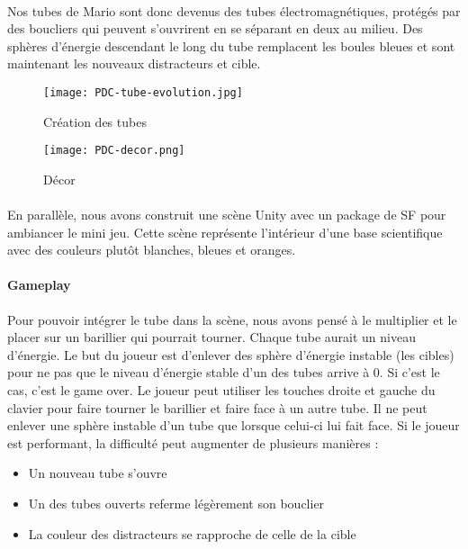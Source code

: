\paragraph{}Nos tubes de Mario sont donc devenus des tubes électromagnétiques, protégés par des boucliers qui peuvent s'ouvrirent en se séparant en deux au milieu. Des sphères
d'énergie descendant le long du tube remplacent les boules bleues et sont maintenant les nouveaux distracteurs et cible.

\begin{figure}[H]
    \begin{center}
    \texttt{[image: PDC-tube-evolution.jpg]}
    \end{center}
    \caption{Création des tubes}
\label{TubeEvolution}
\end{figure}

\begin{wrapfigure}[5]{r}{5cm}
    \vspace{-25pt}
    \texttt{[image: PDC-decor.png]}
    \captionsetup{labelformat=simpleNumber}
    \caption{Décor}
\end{wrapfigure}

\paragraph{}En parallèle, nous avons construit une scène Unity avec un package de \gls{SF} pour ambiancer le mini jeu. Cette scène représente l'intérieur d'une base scientifique avec
des couleurs plutôt blanches, bleues et oranges.

\newpage

\paragraph{Gameplay}Pour pouvoir intégrer le tube dans la scène, nous avons pensé à le multiplier et le placer sur un barillier qui pourrait tourner. Chaque tube aurait un niveau
d'énergie. Le but du joueur est d'enlever des sphère d'énergie instable (les cibles) pour ne pas que le niveau d'énergie stable d'un des tubes arrive à 0. Si c'est le cas, c'est le
game over. Le joueur peut utiliser les touches droite et gauche du clavier pour faire tourner le barillier et faire face à un autre tube. Il ne peut enlever une sphère instable d'un
tube que lorsque celui-ci lui fait face. Si le joueur est performant, la difficulté peut augmenter de plusieurs manières :
\begin{itemize}
    \item Un nouveau tube s'ouvre
    \item Un des tubes ouverts referme légèrement son bouclier
    \item La couleur des distracteurs se rapproche de celle de la cible
\end{itemize}

